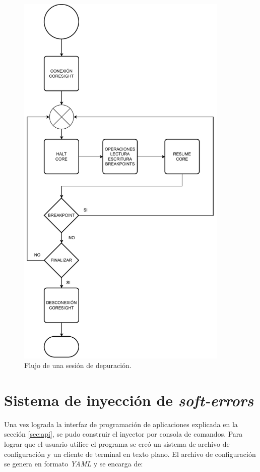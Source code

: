 \begin{figure}[htbp]
	\centering
	\includegraphics[width=0.9\textwidth]{./Figures/debugsession.pdf}
    \caption{Flujo de una sesión de depuración.}
	\label{fig:debugsession}
\end{figure}

\section{Sistema de inyección de \emph{soft-errors}}
\label{sec:sise}

Una vez lograda la interfaz de programación de aplicaciones explicada en la sección \ref{sec:api}, se pudo construir el inyector por consola de comandos.
Para lograr que el usuario utilice el programa se creó un sistema de archivo de configuración y un cliente de terminal en texto plano.
El archivo de configuración se genera en formato \emph{YAML} y se encarga de:


